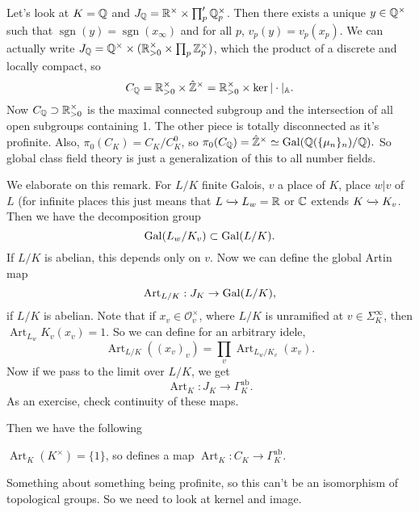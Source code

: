 Let's look at $K = \mathbb{Q}$ and $J_{\mathbb{Q}} = \mathbb{R}^\times \times
\prod_p ' \mathbb{Q}_p^\times$. Then there exists a unique $y \in \mathbb{Q}^\times$ such that
$\operatorname{sgn}(y) = \operatorname{sgn}(x_\infty)$ and for all $p$, $v_p(y)
= v_p(x_p)$. We can actually write $J_{\mathbb{Q}} = \mathbb{Q}^\times \times
(\mathbb{R}^\times_{> 0} \times \prod_p \mathbb{Z}_p^\times)$, which the product of a
discrete and locally compact, so \[ C_{\mathbb{Q}} = \mathbb{R}^\times_{> 0} \times
\hat{\mathbb{Z}}^\times = \mathbb{R}^\times_{> 0} \times \ker | \cdot |_\mathbb{A}. \]
Now $C_{\mathbb{Q}} \supset \mathbb{R}^\times_{> 0}$ is the maximal connected subgroup and
the intersection of all open subgroups containing 1. The other piece is totally
disconnected as it's profinite. Also, $\pi_0 (C_K) = C_K / C_K^0$, so
$\pi_0(C_{\mathbb{Q}}) = \hat{\mathbb{Z}}^\times \simeq \mathrm{Gal}{(\mathbb{Q}(\{\mu_n\}_n) / \mathbb{Q})}.$ So
global class field theory is just a generalization of this to all number fields.

We elaborate on this remark. For $L/K$ finite Galois, $v$ a place of $K$, place
$w | v$ of $L$ (for infinite places this just means that $L \xhookrightarrow{}
L_w = \mathbb{R}$ or $\mathbb{C}$ extends $K \xhookrightarrow{} K_v$. Then we have the
decomposition group \[ \mathrm{Gal}{(L_w / K_v)} \subset \mathrm{Gal}{(L / K)}.  \] If $L/K$ is
abelian, this depends only on $v$. Now we can define the global Artin map \[
  \operatorname{Art}_{L/K} : J_K \rightarrow \mathrm{Gal}{(L / K)}, \] if $L/K$ is abelian.
Note that if $x_v \in \mathcal{O}_v^\times$, where $L/K$ is unramified at $v \in
\Sigma_K^\infty$, then $\operatorname{Art}_{L_w}{K_v} (x_v) = 1$. So we can
define for an arbitrary idele, \[ \operatorname{Art}_{L/K}((x_v)_v) = \prod_v
\operatorname{Art}_{L_w/K_v} (x_v).  \] Now if we pass to the limit over $L/K$,
we get \[ \operatorname{Art}_K : J_K \rightarrow \Gamma_K^{\mathrm{ab}}. \] As
an exercise, check continuity of these maps.

Then we have the following
\begin{thm}
  $\operatorname{Art}_K(K^\times) = \{1 \}$, so defines a map
  $\operatorname{Art}_K : C_K \rightarrow \Gamma_K^{\mathrm{ab}}.$
\end{thm}

Something about something being profinite, so this can't be an isomorphism of
topological groups. So we need to look at kernel and image.




